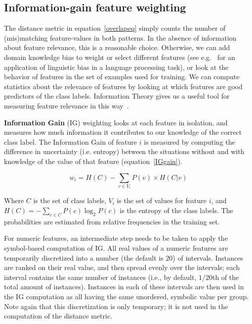 \documentclass{report}
\begin{document}
\subsection{Information-gain feature weighting}
\label{infogain}

The distance metric in equation~\ref{overlapeq} simply counts the
number of (mis)matching feature-values in both patterns. In the
absence of information about feature relevance, this is a reasonable
choice. Otherwise, we can add domain knowledge bias to weight or
select different features (see e.g.~ for an
application of linguistic bias in a language processing task), or look
at the behavior of features in the set of examples used for
training. We can compute statistics about the relevance of features by
looking at which features are good predictors of the class
labels. Information Theory gives us a useful tool for measuring
feature relevance in this way~\cite{Quinlan86,Quinlan93}.

{\bf Information Gain} (IG) weighting looks at each feature in
isolation, and measures how much information it contributes to our
knowledge of the correct class label. The Information Gain of feature
$i$ is measured by computing the difference in uncertainty
(i.e. entropy) between the situations without and with knowledge of
the value of that feature (equation~\ref{IGgain}).

\begin{equation}
w_{i} = H(C) -  \sum_{v \in V_{i}} P(v) \times H(C|v)
\label{IGgain}
\end{equation}

Where $C$ is the set of class labels, $V_{i}$ is the set of values for
feature $i$, and $H(C) = - \sum_{c \in C} P(c) \log_{2} P(c)$ is the
entropy of the class labels. The probabilities are estimated from
relative frequencies in the training set. 

For numeric features, an intermediate step needs to be taken to apply
the symbol-based computation of IG. All real values of a numeric
features are temporarily discretized into a number (the default is 20)
of intervals. Instances are ranked on their real value, and then
spread evenly over the intervals; each interval contains the same
number of instances (i.e., by default, $1/20$th of the total amount of
instances). Instances in each of these intervals are then used in the
IG computation as all having the same unordered, symbolic value per
group. Note again that this discretization is only temporary; it is
not used in the computation of the distance metric.
\end{document}
